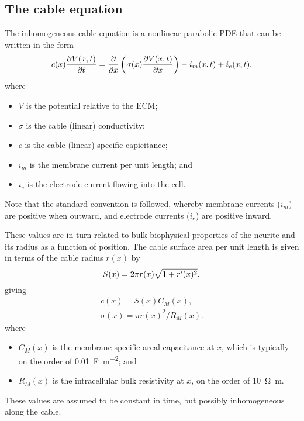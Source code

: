 \subsection{The cable equation}
The inhomogeneous cable equation is a nonlinear parabolic PDE that can be written in the form
\begin{equation}
    \label{eq:cable}
    c(x) \frac{\partial{V(x, t)}}{\partial{t}} = \frac{\partial{}}{\partial{x}} \left( \sigma(x) \frac{\partial{V(x, t)}}{\partial{x}} \right) - i_m(x, t) + i_e(x, t),
\end{equation}
where
\begin{itemize}
    \item $V$ is the potential relative to the ECM;
    \item $\sigma$ is the cable (linear) conductivity;
    \item $c$ is the cable (linear) specific capicitance;
    \item $i_m$ is the membrane current per unit length; and
    \item $i_e$ is the electrode current flowing into the cell.
\end{itemize}
Note that the standard convention is followed, whereby membrane currents ($i_m$)
are positive when outward, and electrode currents ($i_e$) are positive inward.


These values are in turn related to bulk biophysical properties of the
neurite and its radius as a function of position. The cable surface area
per unit length is given in terms of the cable radius $r(x)$ by
\begin{equation}
    \label{eq:area}
    S(x) = 2 \pi r(x) \sqrt{1 + r'(x)^2}, \\
\end{equation}
giving
\begin{gather}
    c(x) = S(x) C_M(x), \\
    \sigma(x) = \pi r(x)^2 / R_M(x).
\end{gather}
where
\begin{itemize}
    \item $C_M(x)$ is the membrane specific areal capacitance at $x$, which is typically on the order of \SI{0.01}{\F\per\m\squared}; and
    \item $R_M(x)$ is the intracellular bulk resistivity at $x$, on the order of \SI{10}{\ohm\m}.
\end{itemize}
These values are assumed to be constant in time, but possibly inhomogeneous along the cable.

